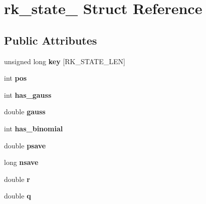 \hypertarget{structrk__state__}{}\section{rk\+\_\+state\+\_\+ Struct Reference}
\label{structrk__state__}
\subsection*{Public Attributes}
\begin{DoxyCompactItemize}
\item 
unsigned long {\bfseries key} \mbox{[}R\+K\+\_\+\+S\+T\+A\+T\+E\+\_\+\+L\+EN\mbox{]}\hypertarget{structrk__state___afd8094f9038c102a8b44f37963abea38}{}\label{structrk__state___afd8094f9038c102a8b44f37963abea38}

\item 
int {\bfseries pos}\hypertarget{structrk__state___add68639d71bda23ce361bee7ae118179}{}\label{structrk__state___add68639d71bda23ce361bee7ae118179}

\item 
int {\bfseries has\+\_\+gauss}\hypertarget{structrk__state___ae4be84a1ab7ac1aa28c4e90b3706899a}{}\label{structrk__state___ae4be84a1ab7ac1aa28c4e90b3706899a}

\item 
double {\bfseries gauss}\hypertarget{structrk__state___aaf768ba8b4d95e4756b411330c93e29d}{}\label{structrk__state___aaf768ba8b4d95e4756b411330c93e29d}

\item 
int {\bfseries has\+\_\+binomial}\hypertarget{structrk__state___a4d2dd4e2ab2823a781ea83092ae06d7c}{}\label{structrk__state___a4d2dd4e2ab2823a781ea83092ae06d7c}

\item 
double {\bfseries psave}\hypertarget{structrk__state___ad8870f11526b48c7b32d112c312b0ef2}{}\label{structrk__state___ad8870f11526b48c7b32d112c312b0ef2}

\item 
long {\bfseries nsave}\hypertarget{structrk__state___a081a6404ff746bb485f455d1255e69cd}{}\label{structrk__state___a081a6404ff746bb485f455d1255e69cd}

\item 
double {\bfseries r}\hypertarget{structrk__state___af991cd53f913cc768718482f3b96e798}{}\label{structrk__state___af991cd53f913cc768718482f3b96e798}

\item 
double {\bfseries q}\hypertarget{structrk__state___aa33be0db6a6ff55b0a966c0c42002ff3}{}\label{structrk__state___aa33be0db6a6ff55b0a966c0c42002ff3}


\end{DoxyCompactItemize}
